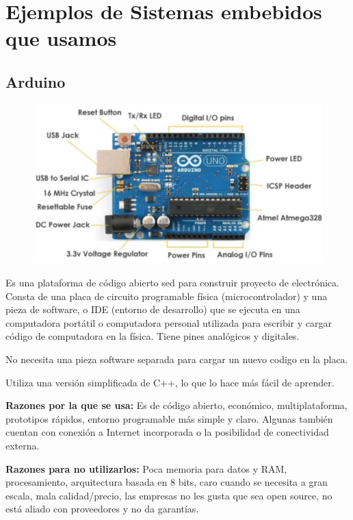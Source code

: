 \documentclass[12pt]{report} %
\begin{document}
\section{Ejemplos de Sistemas embebidos que usamos}
\subsection{Arduino}

\begin{figure}[H]
	{\includegraphics[scale=.5]{2021-03-19 17_31_12-DSO Elementos Sistema embebido.mkv.png}}
\end{figure}


Es una plataforma de código abierto sed para construir proyecto de electrónica.	Consta de una placa de circuito programable física (microcontrolador) y una pieza de software, o IDE (entorno de desarrollo) que se ejecuta en una computadora portátil o computadora personal utilizada para escribir y cargar código de computadora en la física. Tiene pines analógicos y digitales.
	
No necesita una pieza software separada para cargar un nuevo codigo en la placa.
	
Utiliza una versión simplificada de C++, lo que lo hace más fácil de aprender.
	
\textbf{Razones por la que se usa:} Es de código abierto, económico, multiplataforma, prototipos rápidos, entorno programable más simple y claro. Algunas también cuentan con conexión a Internet incorporada o la posibilidad de conectividad externa.
	
\textbf{Razones para no utilizarlos:} Poca memoria para datos y RAM, procesamiento, arquitectura basada en 8 bits, caro cuando se necesita a gran escala, mala calidad/precio, las empresas no les gusta que sea open source, no está aliado con proveedores y no da garantías.
\end{document}
